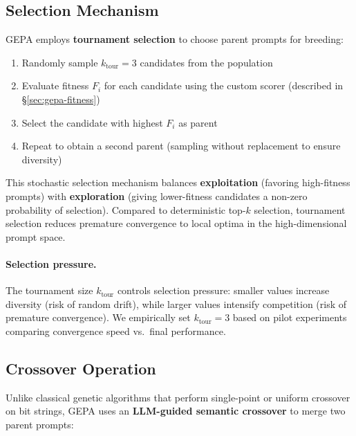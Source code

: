 \documentclass[11pt]{article}
\begin{document}
\subsection{Selection Mechanism}

GEPA employs \textbf{tournament selection} to choose parent prompts for
breeding:

\begin{enumerate}[noitemsep]
	\item Randomly sample $k_{\text{tour}} = 3$ candidates from the population
	\item Evaluate fitness $F_i$ for each candidate using the custom scorer (described in
	      \S\ref{sec:gepa-fitness})
	\item Select the candidate with highest $F_i$ as parent
	\item Repeat to obtain a second parent (sampling without replacement to ensure
	      diversity)
\end{enumerate}

This stochastic selection mechanism balances \textbf{exploitation} (favoring
high-fitness prompts) with \textbf{exploration} (giving lower-fitness
candidates a non-zero probability of selection). Compared to deterministic
top-$k$ selection, tournament selection reduces premature convergence to local
optima in the high-dimensional prompt space.

\paragraph{Selection pressure.} The tournament size $k_{\text{tour}}$ controls selection pressure: smaller
values increase diversity (risk of random drift), while larger values intensify
competition (risk of premature convergence). We empirically set
$k_{\text{tour}} = 3$ based on pilot experiments comparing convergence speed
vs.\ final performance.

\subsection{Crossover Operation}

Unlike classical genetic algorithms that perform single-point or uniform
crossover on bit strings, GEPA uses an \textbf{LLM-guided semantic crossover}
to merge two parent prompts:
\end{document}
